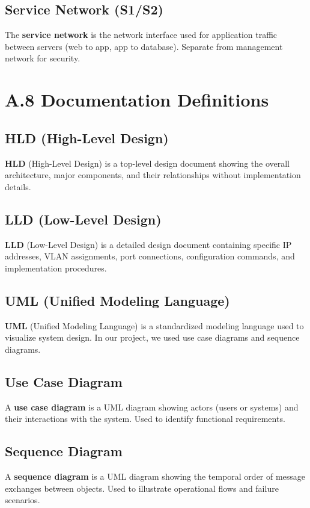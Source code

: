 \subsection*{Service Network (S1/S2)}
\label{def:service}
The \textbf{service network} is the network interface used for application 
traffic between servers (web to app, app to database). Separate from 
management network for security.

\section*{A.8 Documentation Definitions}

\subsection*{HLD (High-Level Design)}
\label{def:hld}
\textbf{HLD} (High-Level Design) is a top-level design document showing the 
overall architecture, major components, and their relationships without 
implementation details.

\subsection*{LLD (Low-Level Design)}
\label{def:lld}
\textbf{LLD} (Low-Level Design) is a detailed design document containing 
specific IP addresses, VLAN assignments, port connections, configuration 
commands, and implementation procedures.

\subsection*{UML (Unified Modeling Language)}
\label{def:uml}
\textbf{UML} (Unified Modeling Language) is a standardized modeling language 
used to visualize system design. In our project, we used use case diagrams 
and sequence diagrams.

\subsection*{Use Case Diagram}
\label{def:usecase}
A \textbf{use case diagram} is a UML diagram showing actors (users or systems) 
and their interactions with the system. Used to identify functional 
requirements.

\subsection*{Sequence Diagram}
\label{def:sequence}
A \textbf{sequence diagram} is a UML diagram showing the temporal order of 
message exchanges between objects. Used to illustrate operational flows and 
failure scenarios.